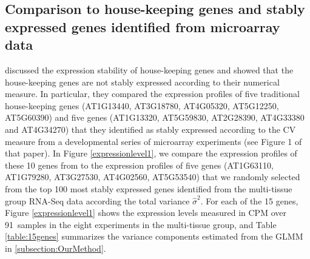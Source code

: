 \documentclass[letterpaper,12pt]{article}
\newcommand{\howmanytissuesample}{91~}
\newcommand{\SelectFiveGene}{AT1G63110, AT1G79280, AT3G27530, AT4G02560, AT5G53540}
\begin{document}
	
	
	\subsection{Comparison to house-keeping genes and stably expressed genes
		identified from microarray data}\label{section:CompareStablyExpressedGene}
	\citeauthor{czechowski2005genome} discussed the expression stability of
	house-keeping genes and showed that the house-keeping genes are not stably
	expressed according to their numerical measure. In particular, they compared
	the expression profiles of five traditional house-keeping genes (AT1G13440,
	AT3G18780, AT4G05320, AT5G12250, AT5G60390) and five genes (AT1G13320,
	AT5G59830, AT2G28390, AT4G33380 and AT4G34270) that they identified  as stably
	expressed according to the CV measure from a developmental series of
	microarray experiments (see Figure 1 of that paper).  
	In Figure \ref{expressionlevel1}, we compare the expression profiles 
	of these 10 genes from \citeauthor{czechowski2005genome} to the expression profiles
	of five genes (\SelectFiveGene) that we
	randomly selected from the top 100 most stably expressed genes identified from
	the multi-tissue group RNA-Seq data according the total variance $\hat\sigma^2$.
	For each of the 15 genes, Figure \ref{expressionlevel1} shows the expression levels measured
	in CPM over \howmanytissuesample samples in the eight experiments in the multi-tissue group,
	and Table \ref{table:15genes} summarizes the variance components estimated from the
	GLMM in \ref{subsection:OurMethod}. 
	
\end{document}
